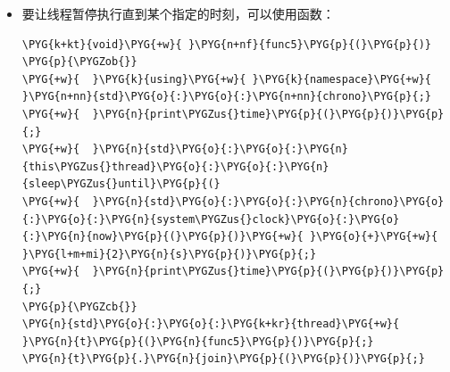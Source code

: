 \begin{itemize}
\begin{codeblockbg}
\begin{Verbatim}[commandchars=\\\{\},breaklines=true,breakanywhere=true,fontsize=\codefont,xleftmargin=17bp]
\PYG{k+kt}{void}\PYG{+w}{ }\PYG{n+nf}{func4}\PYG{p}{(}\PYG{p}{)}
\PYG{p}{\PYGZob{}}
\PYG{+w}{  }\PYG{k}{using}\PYG{+w}{ }\PYG{k}{namespace}\PYG{+w}{ }\PYG{n+nn}{std}\PYG{o}{:}\PYG{o}{:}\PYG{n+nn}{chrono}\PYG{p}{;}
\PYG{+w}{  }\PYG{n}{print\PYGZus{}time}\PYG{p}{(}\PYG{p}{)}\PYG{p}{;}
\PYG{+w}{  }\PYG{n}{std}\PYG{o}{:}\PYG{o}{:}\PYG{n}{this\PYGZus{}thread}\PYG{o}{:}\PYG{o}{:}\PYG{n}{sleep\PYGZus{}for}\PYG{p}{(}\PYG{l+m+mi}{2}\PYG{n}{s}\PYG{p}{)}\PYG{p}{;}
\PYG{+w}{  }\PYG{n}{print\PYGZus{}time}\PYG{p}{(}\PYG{p}{)}\PYG{p}{;}
\PYG{p}{\PYGZcb{}}
\PYG{n}{std}\PYG{o}{:}\PYG{o}{:}\PYG{k+kr}{thread}\PYG{+w}{ }\PYG{n}{t}\PYG{p}{(}\PYG{n}{func4}\PYG{p}{)}\PYG{p}{;}
\PYG{n}{t}\PYG{p}{.}\PYG{n}{join}\PYG{p}{(}\PYG{p}{)}\PYG{p}{;}
\end{Verbatim}
\end{codeblockbg}



\item 要让线程暂停执行直到某个指定的时刻，可以使用函数：



\begin{codeblockbg}
\begin{Verbatim}[commandchars=\\\{\},breaklines=true,breakanywhere=true,fontsize=\codefont,xleftmargin=17bp]
\PYG{k+kt}{void}\PYG{+w}{ }\PYG{n+nf}{func5}\PYG{p}{(}\PYG{p}{)}
\PYG{p}{\PYGZob{}}
\PYG{+w}{  }\PYG{k}{using}\PYG{+w}{ }\PYG{k}{namespace}\PYG{+w}{ }\PYG{n+nn}{std}\PYG{o}{:}\PYG{o}{:}\PYG{n+nn}{chrono}\PYG{p}{;}
\PYG{+w}{  }\PYG{n}{print\PYGZus{}time}\PYG{p}{(}\PYG{p}{)}\PYG{p}{;}
\PYG{+w}{  }\PYG{n}{std}\PYG{o}{:}\PYG{o}{:}\PYG{n}{this\PYGZus{}thread}\PYG{o}{:}\PYG{o}{:}\PYG{n}{sleep\PYGZus{}until}\PYG{p}{(}
\PYG{+w}{  }\PYG{n}{std}\PYG{o}{:}\PYG{o}{:}\PYG{n}{chrono}\PYG{o}{:}\PYG{o}{:}\PYG{n}{system\PYGZus{}clock}\PYG{o}{:}\PYG{o}{:}\PYG{n}{now}\PYG{p}{(}\PYG{p}{)}\PYG{+w}{ }\PYG{o}{+}\PYG{+w}{ }\PYG{l+m+mi}{2}\PYG{n}{s}\PYG{p}{)}\PYG{p}{;}
\PYG{+w}{  }\PYG{n}{print\PYGZus{}time}\PYG{p}{(}\PYG{p}{)}\PYG{p}{;}
\PYG{p}{\PYGZcb{}}
\PYG{n}{std}\PYG{o}{:}\PYG{o}{:}\PYG{k+kr}{thread}\PYG{+w}{ }\PYG{n}{t}\PYG{p}{(}\PYG{n}{func5}\PYG{p}{)}\PYG{p}{;}
\PYG{n}{t}\PYG{p}{.}\PYG{n}{join}\PYG{p}{(}\PYG{p}{)}\PYG{p}{;}
\end{Verbatim}
\end{codeblockbg}



\end{itemize}
